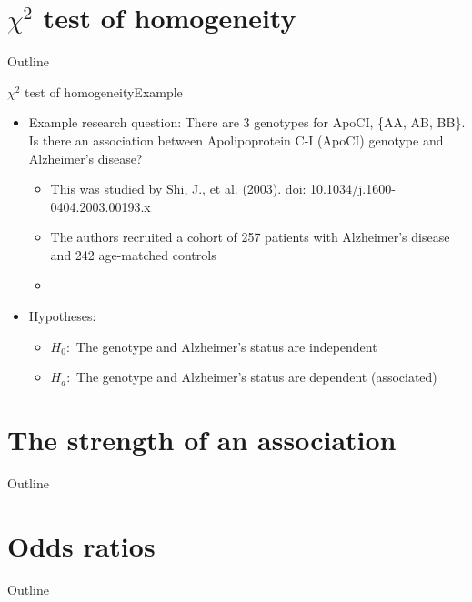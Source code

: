 \documentclass[xcolor=dvipsnames]{beamer}
\begin{document}
\section{$\chi^2$ test of homogeneity}
\begin{frame}{Outline}
\tableofcontents[currentsection,subsectionstyle=show/shaded/hide]
\end{frame}

\begin{frame}{$\chi^2$ test of homogeneity}{Example}
\begin{itemize}
	\item Example research question: There are 3 genotypes for ApoCI, \{AA, AB, BB\}. Is there an association between Apolipoprotein C-I (ApoCI) genotype and Alzheimer's disease? 
	\begin{itemize}
		\item This was studied by Shi, J., et al. (2003). doi: 10.1034/j.1600-0404.2003.00193.x
		\item The authors recruited a cohort of 257 patients with Alzheimer's disease and 242 age-matched controls
		\item[]
	\end{itemize}
	\item Hypotheses: 
	\begin{itemize}
		\item $H_0:$ The genotype and Alzheimer's status are independent 
		\item $H_a:$ The genotype and Alzheimer's status are dependent (associated)
	\end{itemize}
\end{itemize}
\end{frame}

\section{The strength of an association}
\begin{frame}{Outline}
\tableofcontents[currentsection,subsectionstyle=show/shaded/hide]
\end{frame}

\section{Odds ratios}
\begin{frame}{Outline}
\tableofcontents[currentsection,subsectionstyle=show/shaded/hide]
\end{frame}
\end{document}
